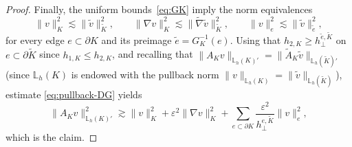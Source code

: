 \documentclass[a4paper,twoside,10pt]{article}
\newcommand{\LKh}{\mathbb{L}_h(K)}
\newcommand{\eps}{\varepsilon}
\numberwithin{equation}{section}
\newcommand{\Kt}{\widetilde{K}}
\newcommand{\hKot}{h_{1,K}}
\newcommand{\hKtt}{h_{2,K}}
\begin{document}
\begin{proof}
	Finally, the uniform bounds~\eqref{eq:GK} imply the norm equivalences
	\begin{equation*}
	\|v\|_{K}^2 \lesssim \|\tilde v\|_{\Kt}^2,
	\qquad
	\|\nabla v\|_{K}^2 \lesssim \|\widetilde\nabla \tilde v\|_{\Kt}^2,
	\qquad
	\|v\|_{e}^2 \lesssim \|\tilde v\|_{\tilde e}^2,
	\end{equation*}
	for every edge $e\subset\partial K$ and its preimage $\tilde e=G_K^{-1}(e)$.
	Using that $\hKtt\ge h_\perp^{\tilde e,\Kt}$ on $e \subset \partial\Kt$ since $\hKot\leq \hKtt$, and recalling that
		$
		\|A_K v\|_{\LKh'}=\|\widetilde A_K \tilde v\|_{\mathbb L_h(\Kt)'}
		$ (since $\LKh$ is endowed with the pullback norm
		$
		\|v\|_{\LKh}=\|\tilde v\|_{\mathbb L_h(\Kt)}
		$), estimate \eqref{eq:pullback-DG} yields
	\begin{equation*}
	\|A_K v\|_{\LKh'}^2 \gtrsim
	\|v\|_{K}^2
	+\eps^2\|\nabla v\|_{K}^2
	+\sum_{e\subset\partial K}\frac{\eps^2}{h_\perp^{e,\Kt}}\|v\|_{e}^2,
	\end{equation*}
	which is the claim.
	\end{proof}
	
\end{document}
